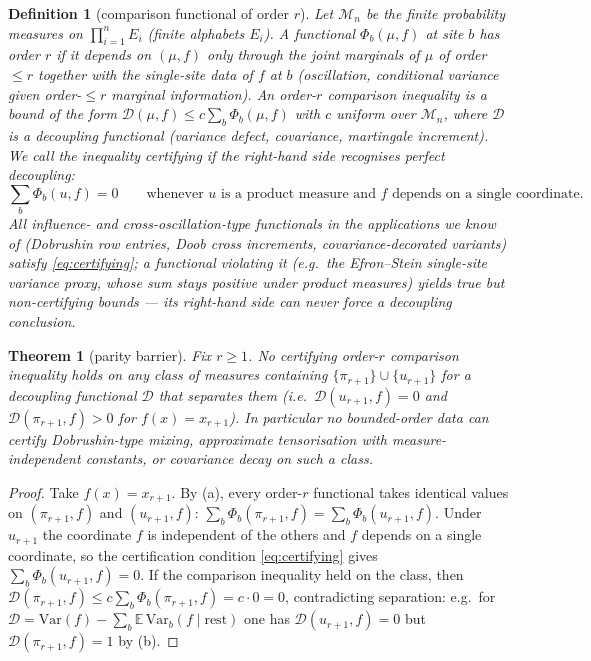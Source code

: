 \documentclass[11pt]{article}
\newtheorem{theorem}{Theorem}
\newtheorem{definition}{Definition}
\theoremstyle{remark}
\newcommand{\Var}{\mathrm{Var}}
\begin{document}
\begin{definition}[comparison functional of order $r$]
\label{def:order}
Let $\mathcal M_n$ be the finite probability measures on
$\prod_{i=1}^n E_i$ (finite alphabets $E_i$). A functional
$\Phi_b(\mu,f)$ at site $b$ \emph{has order $r$} if it depends on
$(\mu, f)$ only through the joint marginals of $\mu$ of order $\le r$
together with the single-site data of $f$ at $b$ (oscillation,
conditional variance given order-$\le r$ marginal information). An
\emph{order-$r$ comparison inequality} is a bound of the form
$\mathcal D(\mu,f) \le c \sum_b \Phi_b(\mu,f)$ with $c$ uniform over
$\mathcal M_n$, where $\mathcal D$ is a decoupling functional
(variance defect, covariance, martingale increment). We call the
inequality \emph{certifying} if the right-hand side recognises
perfect decoupling:
\begin{equation}
\label{eq:certifying}
\sum_b \Phi_b(u, f) = 0
\qquad\text{whenever $u$ is a product measure and $f$ depends on a
single coordinate.}
\end{equation}
All influence- and cross-oscillation-type functionals in the
applications we know of (Dobrushin row entries, Doob cross
increments, covariance-decorated variants) satisfy
\eqref{eq:certifying}; a functional violating it (e.g.\ the
Efron--Stein single-site variance proxy, whose sum stays positive
under product measures) yields true but non-certifying bounds ---
its right-hand side can never force a decoupling conclusion.
\end{definition}

\begin{theorem}[parity barrier]
\label{thm:main}
Fix $r \ge 1$. No \emph{certifying} order-$r$ comparison inequality
holds on any class of measures containing
$\{\pi_{r+1}\} \cup \{u_{r+1}\}$ for a decoupling functional
$\mathcal D$ that separates them (i.e.\ $\mathcal D(u_{r+1},f)=0$
and $\mathcal D(\pi_{r+1},f)>0$ for $f(x)=x_{r+1}$). In particular
no bounded-order data can certify Dobrushin-type mixing, approximate
tensorisation with measure-independent constants, or covariance decay
on such a class.
\end{theorem}

\begin{proof}
Take $f(x) = x_{r+1}$. By (a), every order-$r$ functional takes
identical values on $(\pi_{r+1}, f)$ and $(u_{r+1}, f)$:
$\sum_b \Phi_b(\pi_{r+1}, f) = \sum_b \Phi_b(u_{r+1}, f)$. Under
$u_{r+1}$ the coordinate $f$ is independent of the others and $f$
depends on a single coordinate, so the certification condition
\eqref{eq:certifying} gives $\sum_b \Phi_b(u_{r+1}, f) = 0$. If the
comparison inequality held on the class, then
$\mathcal D(\pi_{r+1}, f) \le c \sum_b \Phi_b(\pi_{r+1}, f) =
c \cdot 0 = 0$, contradicting separation: e.g.\ for
$\mathcal D = \Var(f) - \sum_b \mathbb E\,
\Var_b(f \mid \text{rest})$ one has $\mathcal D(u_{r+1},f) = 0$
but $\mathcal D(\pi_{r+1},f) = 1$ by (b).
\end{proof}
\end{document}
